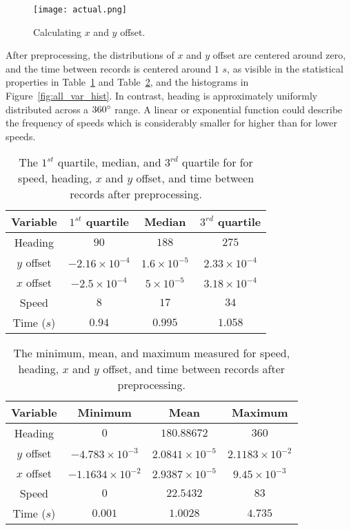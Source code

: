 \documentclass[preprint,12pt]{elsarticle}
\begin{document}
\begin{figure}[!ht]
    \centering
    \texttt{[image: actual.png]}
    \caption{Calculating $x$ and $y$ offset.}
    \label{fig:actual}
\end{figure}

After preprocessing, the distributions of $x$ and $y$ offset are centered around zero, and the time between records is centered around $1$ $s$, as visible in the statistical properties in Table~\ref{tab:q1q2q3var} and Table~\ref{tab:miniavgmaxivar}, and the histograms in Figure~\ref{fig:all_var_hist}. In contrast, heading is approximately uniformly distributed across a $360\degree$ range. A linear or exponential function could describe the frequency of speeds which is considerably smaller for higher than for lower speeds.

\begin{table}[!ht]
    \centering
    \begin{tabular}{|c|c|c|c|} 
        \hline
        Variable & $1^{st}$ quartile & Median & $3^{rd}$ quartile \\ \hline
        Heading & $90$ & $188$ & $275$ \\ \hline
        $y$ offset & $-2.16 \times 10^{-4}$ & $1.6 \times 10^{-5}$ & $2.33 \times 10^{-4}$ \\ \hline
        $x$ offset & $-2.5 \times 10^{-4}$ & $5 \times 10^{-5}$ & $3.18 \times 10^{-4}$ \\ \hline
        Speed & $8$ & $17$ & $34$ \\ \hline
        Time ($s$) & $0.94$ & $0.995$ & $1.058$ \\ \hline
    \end{tabular}
    \caption{The $1^{st}$ quartile, median, and $3^{rd}$ quartile for for speed, heading, $x$ and $y$ offset, and time between records after preprocessing.}
    \label{tab:q1q2q3var}
\end{table}

\begin{table}[!ht]
    \centering
    \begin{tabular}{|c|c|c|c|} 
        \hline
        Variable & Minimum & Mean & Maximum \\ \hline
        Heading & $0$ & $180.88672$ & $360$ \\ \hline
        $y$ offset & $-4.783 \times 10^{-3}$ & $2.0841 \times 10^{-5}$ & $2.1183 \times 10^{-2}$ \\ \hline
        $x$ offset & $-1.1634 \times 10^{-2}$ & $2.9387 \times 10^{-5}$ & $9.45 \times 10^{-3}$ \\ \hline
        Speed & $0$ & $22.5432$ & $83$ \\ \hline
        Time ($s$) & $0.001$ & $1.0028$ & $4.735$ \\ \hline
    \end{tabular}
    \caption{The minimum, mean, and maximum measured for speed, heading, $x$ and $y$ offset, and time between records after preprocessing.}
    \label{tab:miniavgmaxivar}
\end{table}
\end{document}
